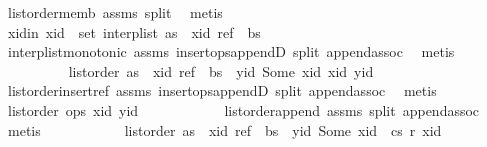 \begin{isabellebody}
\ list{\isacharunderscore}order{\isacharunderscore}memb{}\ assms{\isacharparenleft}{}{\isacharparenright}\ split\ \isamarkupfalse%
\ metis\isanewline
\ \ \ \ \ \ \ \ \isamarkupfalse%
\ xid{\isacharunderscore}in{\isacharcolon}\ {\isachardoublequoteopen}xid\ {\isasymin}\ set\ {\isacharparenleft}interp{\isacharunderscore}list\ {\isacharparenleft}as\ {\isacharat}\ {\isacharbrackleft}{\isacharparenleft}xid{\isacharcomma}\ ref{\isacharparenright}{\isacharbrackright}\ {\isacharat}\ bs{\isacharparenright}{\isacharparenright}{\isachardoublequoteclose}\isanewline
\ \ \ \ \ \ \ \ \ \ \isamarkupfalse%
\ interp{\isacharunderscore}list{\isacharunderscore}monotonic\ assms{\isacharparenleft}{}{\isacharparenright}\ insert{\isacharunderscore}ops{\isacharunderscore}appendD\ split\ append{\isachardot}assoc\ \isamarkupfalse%
\ metis\isanewline
\ \ \ \ \ \ \ \ \isamarkupfalse%
\ {\isachardoublequoteopen}list{\isacharunderscore}order\ {\isacharparenleft}as\ {\isacharat}\ {\isacharbrackleft}{\isacharparenleft}xid{\isacharcomma}\ ref{\isacharparenright}{\isacharbrackright}\ {\isacharat}\ bs\ {\isacharat}\ {\isacharbrackleft}{\isacharparenleft}yid{\isacharcomma}\ Some\ xid{\isacharparenright}{\isacharbrackright}{\isacharparenright}\ xid\ yid{\isachardoublequoteclose}\isanewline
\ \ \ \ \ \ \ \ \ \ \isamarkupfalse%
\ list{\isacharunderscore}order{\isacharunderscore}insert{\isacharunderscore}ref\ assms{\isacharparenleft}{}{\isacharparenright}\ insert{\isacharunderscore}ops{\isacharunderscore}appendD\ split\ append{\isachardot}assoc\ \isamarkupfalse%
\ metis\isanewline
\ \ \ \ \ \ \ \ \isamarkupfalse%
\ {\isachardoublequoteopen}list{\isacharunderscore}order\ ops\ xid\ yid{\isachardoublequoteclose}\isanewline
\ \ \ \ \ \ \ \ \ \ \isamarkupfalse%
\ list{\isacharunderscore}order{\isacharunderscore}append\ assms{\isacharparenleft}{}{\isacharparenright}\ split\ append{\isachardot}assoc\ \isamarkupfalse%
\ metis\isanewline
\ \ \ \ \ \ \ \ \isamarkupfalse%
\ \isamarkupfalse%
\ {\isachardoublequoteopen}list{\isacharunderscore}order\ {\isacharparenleft}as\ {\isacharat}\ {\isacharbrackleft}{\isacharparenleft}xid{\isacharcomma}\ ref{\isacharparenright}{\isacharbrackright}\ {\isacharat}\ bs\ {\isacharat}\ {\isacharbrackleft}{\isacharparenleft}yid{\isacharcomma}\ Some\ xid{\isacharparenright}{\isacharbrackright}\ {\isacharat}\ cs{\isacharparenright}\ r\ xid{\isachardoublequoteclose}\isanewline

\end{isabellebody}
